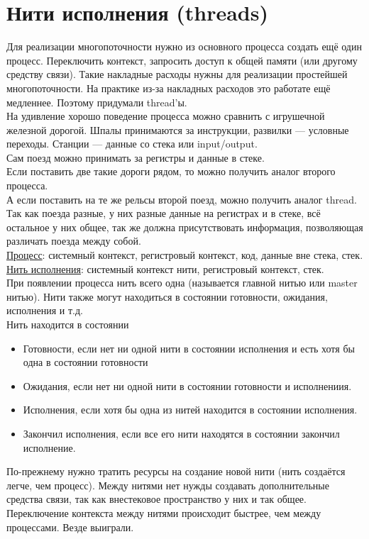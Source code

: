 \documentclass[12pt, a4paper]{article}
\begin{document}
    \section*{Нити исполнения (threads)}
    Для реализации многопоточности нужно из основного процесса создать ещё один процесс. Переключить контекст, запросить доступ к общей памяти (или другому средству связи). Такие накладные расходы
    нужны для реализации простейшей многопоточности. На практике из-за накладных расходов это работате ещё медленнее. Поэтому придумали thread'ы.\\
    На удивление хорошо поведение процесса можно сравнить с игрушечной железной дорогой. Шпалы принимаются за инструкции, развилки --- условные переходы. Станции --- данные со стека или input/output.\\
    Сам поезд можно принимать за регистры и данные в стеке.\\
    Если поставить две такие дороги рядом, то можно получить аналог второго процесса.\\
    А если поставить на те же рельсы второй поезд, можно получить аналог thread. Так как поезда разные, у них разные данные на регистрах и в стеке, всё остальное у них общее, так же должна присутствовать информация, позволяющая различать поезда между собой.\\
    \underline{Процесс}: системный контекст, регистровый контекст, код, данные вне стека, стек.\\
    \underline{Нить исполнения}: системный контекст нити, регистровый контекст, стек.\\
    При появлении процесса нить всего одна (называется главной нитью или master нитью). Нити также могут находиться в состоянии готовности, ожидания, исполнения и т.д.\\
    Нить находится в состоянии
    \begin{itemize}
        \item Готовности, если нет ни одной нити в состоянии исполнения и есть хотя бы одна в состоянии готовности
        \item Ожидания, если нет ни одной нити в состоянии готовности и исполнениия.
        \item Исполнения, если хотя бы одна из нитей находится в состоянии исполнения.
        \item Закончил исполнения, если все его нити находятся в состоянии закончил исполнение.
    \end{itemize}
    По-прежнему нужно тратить ресурсы на создание новой нити
    (нить создаётся легче, чем процесс). Между нитями нет
    нужды создавать дополнительные средства связи, так как
    внестековое пространство у них и так общее. Переключение
    контекста между нитями происходит быстрее, чем между
    процессами. Везде выиграли.
\end{document}
